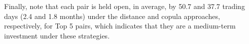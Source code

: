 \documentclass[a4paper]{article}
\begin{document}

%	
%	
%	
%	
	
	Finally, note that each pair is held open, in average, by 50.7 and 37.7 trading days (2.4 and 1.8 months) under the distance and copula approaches, respectively, for Top 5 pairs, which indicates that they are a medium-term investment under these strategies.
	
\end{document}
